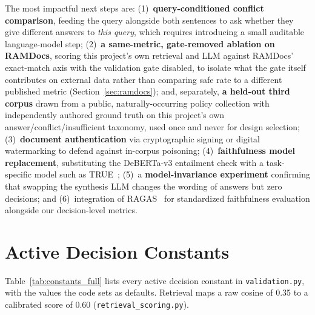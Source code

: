 \documentclass[conference]{IEEEtran}
\begin{document}
The most impactful next steps are: (1)~\textbf{query-conditioned
conflict comparison}, feeding the query alongside both sentences to ask
whether they give different answers to \textit{this query}, which
requires introducing a small auditable language-model step;
(2)~\textbf{a same-metric, gate-removed ablation on RAMDocs}, scoring this
project's own retrieval and LLM against RAMDocs' exact-match axis with the
validation gate disabled, to isolate what the gate itself contributes on
external data rather than comparing safe rate to a different published
metric (Section~\ref{sec:ramdocs}); and, separately, \textbf{a held-out
third corpus} drawn from a public, naturally-occurring policy collection
with independently authored ground truth on this project's own
answer/conflict/insufficient taxonomy, used once and never for design
selection;(3)~\textbf{document authentication}
via cryptographic signing or digital watermarking to defend against
in-corpus poisoning; (4)~\textbf{faithfulness model replacement},
substituting the DeBERTa-v3 entailment check with a task-specific
model such as TRUE~\cite{honovich2022true}; (5)~a
\textbf{model-invariance experiment} confirming that swapping the
synthesis LLM changes the wording of answers but zero decisions; and
(6)~integration of RAGAS~\cite{es2023ragas} for standardized
faithfulness evaluation alongside our decision-level metrics.

\appendix
\section{Active Decision Constants}
\label{app:constants}

Table~\ref{tab:constants_full} lists every active decision constant in
\texttt{validation.py}, with the values the code sets as defaults. Retrieval
maps a raw cosine of 0.35 to a calibrated score of 0.60
(\texttt{retrieval\_scoring.py}).
\end{document}

